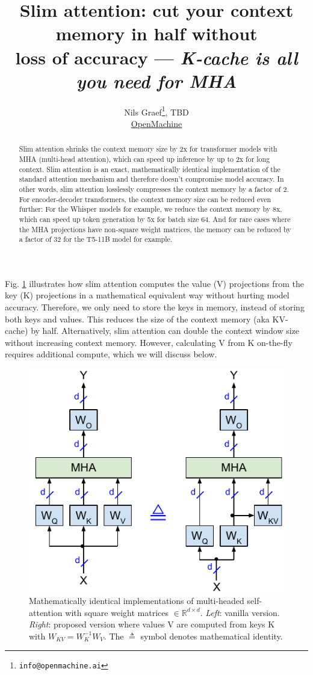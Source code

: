 \documentclass{article}
\title{Slim attention: cut your context memory in half without \\ loss of accuracy --- \emph{K-cache is all you need for MHA}}
\author{Nils Graef\thanks{\texttt{info@openmachine.ai}}, TBD \\ \href{https://openmachine.ai}{OpenMachine}}
\newcommand{\eR}[2]{$\in \mathbb{R}^{#1 \times #2}$} %
\begin{document}
 \maketitle

\begin{abstract}
Slim attention shrinks the context memory size by 2x for transformer models with MHA (multi-head attention), which can speed up inference by up to 2x for long context. Slim attention is an exact, mathematically identical implementation of the standard attention mechanism and therefore doesn’t compromise model accuracy. In other words, slim attention losslessly compresses the context memory by a factor of 2. \\
For encoder-decoder transformers, the context memory size can be reduced even further: For the Whisper models for example, we reduce the context memory by 8x, which can speed up token generation by 5x for batch size 64. And for rare cases where the MHA projections have non-square weight matrices, the memory can be reduced by a factor of 32 for the T5-11B model for example.
\end{abstract}

Fig. \ref{fig1} illustrates how slim attention computes the value (V) projections from the key (K) projections in a mathematical equivalent way without hurting model accuracy. Therefore, we only need to store the keys in memory, instead of storing both keys and values. This reduces the size of the context memory (aka KV-cache) by half. Alternatively, slim attention can double the context window size without increasing context memory. However, calculating V from K on-the-fly requires additional compute, which we will discuss below.
\begin{figure}[h!] \centering  %
  \includegraphics[scale=0.9]{figs/slim_fig1.pdf}
  \caption{Mathematically identical implementations of multi-headed self-attention with square weight matrices \eR{d}{d}. \emph{Left}: vanilla version. \emph{Right}: proposed version where values V are computed from keys K with $W_{KV} = W_K^{-1} W_V$. The $\triangleq$ symbol denotes mathematical identity.}
\label{fig1} \end{figure}
\end{document}
